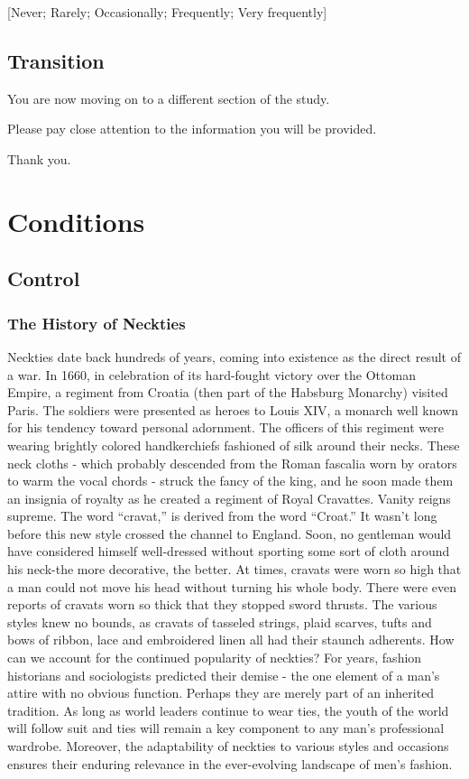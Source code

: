 \documentclass[
  letterpaper,
  DIV=11,
  numbers=noendperiod]{scrartcl}
\begin{document}
{[}Never; Rarely; Occasionally; Frequently; Very frequently{]}

\subsection{Transition}\label{transition-1}

You are now moving on to a different section of the study.

Please pay close attention to the information you will be provided.

Thank you.

\section{Conditions}\label{conditions}

\subsection{Control}\label{control}

\subsubsection{The History of Neckties}\label{the-history-of-neckties}

Neckties date back hundreds of years, coming into existence as the
direct result of a war. In 1660, in celebration of its hard-fought
victory over the Ottoman Empire, a regiment from Croatia (then part of
the Habsburg Monarchy) visited Paris. The soldiers were presented as
heroes to Louis XIV, a monarch well known for his tendency toward
personal adornment. The officers of this regiment were wearing brightly
colored handkerchiefs fashioned of silk around their necks. These neck
cloths - which probably descended from the Roman fascalia worn by
orators to warm the vocal chords - struck the fancy of the king, and he
soon made them an insignia of royalty as he created a regiment of Royal
Cravattes. Vanity reigns supreme. The word ``cravat,'' is derived from
the word ``Croat.'' It wasn't long before this new style crossed the
channel to England. Soon, no gentleman would have considered himself
well-dressed without sporting some sort of cloth around his neck-the
more decorative, the better. At times, cravats were worn so high that a
man could not move his head without turning his whole body. There were
even reports of cravats worn so thick that they stopped sword thrusts.
The various styles knew no bounds, as cravats of tasseled strings, plaid
scarves, tufts and bows of ribbon, lace and embroidered linen all had
their staunch adherents. How can we account for the continued popularity
of neckties? For years, fashion historians and sociologists predicted
their demise - the one element of a man's attire with no obvious
function. Perhaps they are merely part of an inherited tradition. As
long as world leaders continue to wear ties, the youth of the world will
follow suit and ties will remain a key component to any man's
professional wardrobe. Moreover, the adaptability of neckties to various
styles and occasions ensures their enduring relevance in the
ever-evolving landscape of men's fashion.
\end{document}
